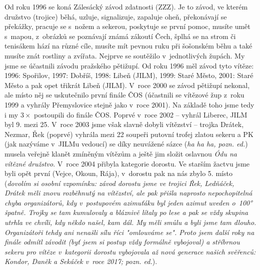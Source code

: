 \documentclass[a5paper, 11pt, twoside]{article}
\begin{document}
Od roku 1996 se koná Zálesácký závod zdatnosti (ZZZ). Je to závod, ve
kterém družstvo (trojice) běhá, uzluje, signalizuje, zapaluje oheň,
překonávají se překážky, pracuje se s~nožem a sekerou, poskytuje se
první pomoc, musíte umět s~mapou, z~obrázků se poznávají známá zákoutí
Čech, šplhá se na strom či tenisákem hází na různé cíle, musíte mít
pevnou ruku při šošonském běhu a také musíte znát rostliny a zvířata.
Nejprve se soutěžilo v~jednotlivých župách. My jsme se účastnili závodu
pražského pětižupí. Od roku 1996 měl závod tyto vítěze: 1996: Spořilov,
1997: Dobříš, 1998: Libeň (JILM), 1999: Staré Město, 2001: Staré Město a
pak opet třikrát Libeň (JILM). V~roce 2000 se závod pětižupí nekonal,
ale místo něj se uskutečnilo první finále ČOS (účastnili se vítězové žup
z~roku 1999 a vyhrály Přemyslovice stejně jako v~roce 2001). Na základě
toho jsme tedy i my \(3\times\) postoupili do finále ČOS. Poprvé v~roce 2002 --
vyhrál Liberec, JILM byl 9. mezi 25. V~roce 2003 jsme však slavně dobyli
vítězství -- trojka Drátek, Nezmar, Řek (poprvé) vyhrála mezi 22 soupeři
putovní trofej zlatou sekeru a PK (jak nazýváme v~JILMu vedoucí) se díky
neuvážené sázce (\textit{ha ha ha, pozn. ed.}) musela veřejně klanět
zmíněným vítězům a ještě jim složit oslavnou \textit{Ódu na vítězné
družstvo}. V~roce 2004 přibyla kategorie dorostu. Ve starším žactvu jsme
byli opět první (Vejce, Okoun, Rája), v~dorostu pak na nás zbylo 5.
místo (\textit{dovolím si osobní vzpomínku: závod dorostu jsme ve trojici
Řek, Ledňáček, Drátek měli znovu rozběhnutý na vítězství, ale pak přišla
naprosto nepochopitelná chyba organizátorů, kdy v~postupovém azimuťáku
byl jeden azimut uveden o~100° špatně. Trojky se tam kumulovaly a
bláznivě lítaly po lese a pak se vždy skupina utrhla ve chvíli, kdy
někdo našel, kam dál. My měli smůlu a byli jsme tam dlouho. Organizátoři
tehdy ani nenašli sílu říci "omlouváme se". Proto jsem další roky na
finále odmítl závodit (byť jsem si postup vždy formálně vybojoval) a
stříbrnou sekeru pro vítěze v~kategorii dorostu vybojovala až nová
generace našich svěřenců: Kondor, Daněk a Sekáček v~roce 2017; pozn.
ed.}).
\end{document}
